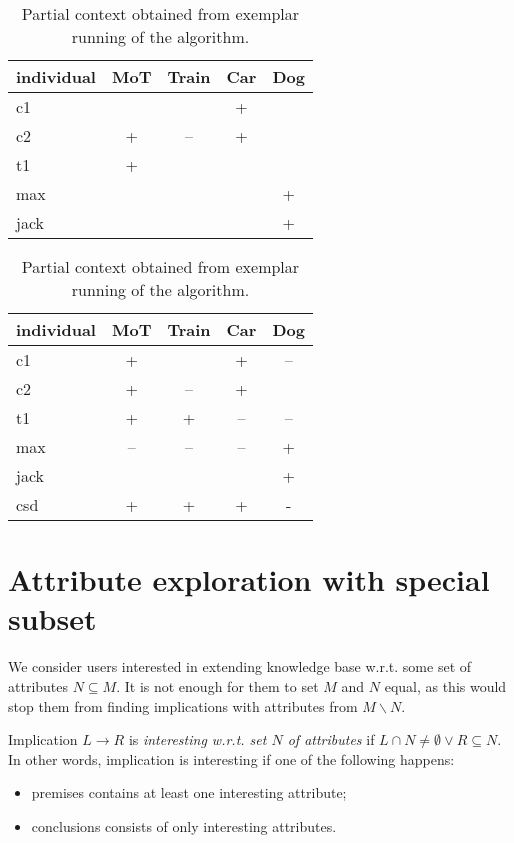\documentclass{llncs}
\newcommand{\ont}{\ensuremath\mathcal{O}}
\begin{document}
\begin{table}
\begin{minipage}{.49\textwidth}
\caption{Partial context $K_{\ont,M}$ induced by the example ontlogy $\ont$.\label{tab:ex1:pc_input}}
\begin{tabular}{|l||c|c|c|c|}
\hline
individual & MoT & Train & Car & Dog \\
\hline
\hline
c1 & & & + & \\
\hline
c2 & + & -- & + & \\
\hline
t1 & + & & & \\
\hline
max & && & +  \\
\hline
jack & && & + \\
\hline
\end{tabular}
\end{minipage}
\begin{minipage}{.49\textwidth}
\caption{Partial context obtained from exemplar running of the algorithm.\label{tab:ex1:pc_output}}
\begin{tabular}{|l||c|c|c|c|}
\hline
individual & MoT & Train & Car & Dog \\
\hline
\hline
c1 & + & & + & --\\
\hline
c2 & + & -- & + & \\
\hline
t1 & + & + & -- & -- \\
\hline
max & -- & -- & --  & +  \\
\hline
jack & && & + \\
\hline
{csd} & {+} & {+} & {+} & {-}  \\
\hline
\end{tabular}
\end{minipage}
\end{table}


\section{Attribute exploration with special subset}

We consider users interested in extending knowledge base w.r.t. some set of
attributes $N\subseteq M$. It is not enough for them to set $M$ and $N$ equal, as
this would stop them from finding implications with attributes from
$M\backslash N$.

\begin{definition}
Implication $L\to R$ is \emph{interesting w.r.t. set $N$ of attributes} if $L\cap N\neq\emptyset \lor R\subseteq N$. In other words, implication is interesting if one of the following happens:
\begin{itemize}
\item premises contains at least one interesting attribute;
\item conclusions consists of only interesting attributes.
\end{itemize}
\end{definition}
\end{document}

